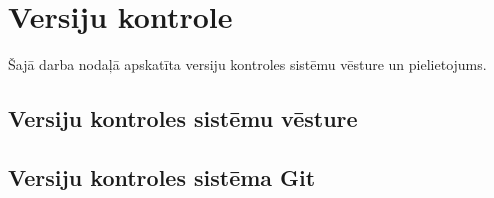 \chapter{Versiju kontrole}


Šajā darba nodaļā apskatīta versiju kontroles sistēmu vēsture un pielietojums.

\section{Versiju kontroles sistēmu vēsture}

\section{Versiju kontroles sistēma Git}
